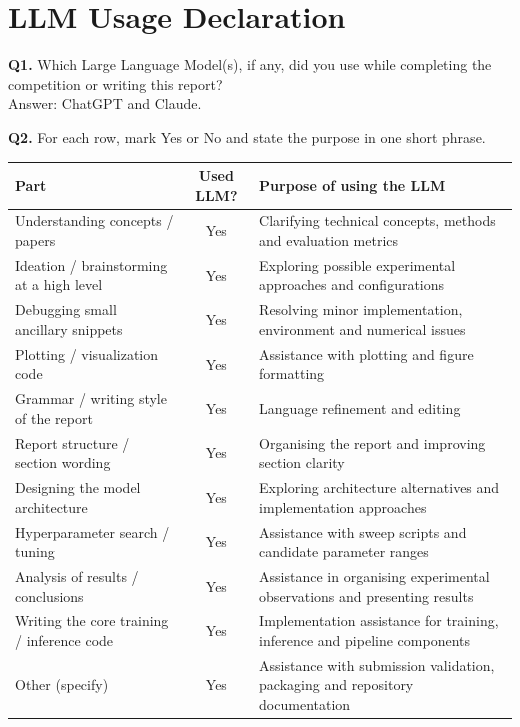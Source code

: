 \documentclass[11pt, oneside]{article}
\begin{document}
\clearpage
\section*{LLM Usage Declaration}
\noindent
\textbf{Q1.} Which Large Language Model(s), if any, did you use while completing the competition or writing this report? \\[0.6em]
Answer: ChatGPT and Claude.

\medskip
\noindent
\textbf{Q2.} For each row, mark Yes or No and state the purpose in one short phrase.
\begin{table}[H]
\centering
\small
\begin{tabular}{>{\raggedright\arraybackslash}p{4.6cm}|c|>{\raggedright\arraybackslash}p{7.6cm}}
\toprule
Part & Used LLM? & Purpose of using the LLM \\
\midrule
Understanding concepts / papers & Yes & Clarifying technical concepts, methods and evaluation metrics \\
Ideation / brainstorming at a high level & Yes & Exploring possible experimental approaches and configurations \\
Debugging small ancillary snippets & Yes & Resolving minor implementation, environment and numerical issues \\
Plotting / visualization code & Yes & Assistance with plotting and figure formatting \\
Grammar / writing style of the report & Yes & Language refinement and editing \\
Report structure / section wording & Yes & Organising the report and improving section clarity \\
Designing the model architecture & Yes & Exploring architecture alternatives and implementation approaches \\
Hyperparameter search / tuning & Yes & Assistance with sweep scripts and candidate parameter ranges \\
Analysis of results / conclusions & Yes & Assistance in organising experimental observations and presenting results \\
Writing the core training / inference code & Yes & Implementation assistance for training, inference and pipeline components \\
Other (specify) & Yes & Assistance with submission validation, packaging and repository documentation \\
\bottomrule
\end{tabular}
\end{table}
\end{document}
